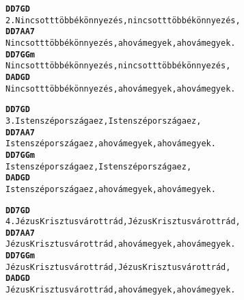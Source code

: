 \cleardoublepage
{}
\kottastart
{}
\kottaend
\begin{minipage}{\textwidth}
\begin{alltt}
\textbf{              D           D7             G           D}
2. Nincs ott többé könnyezés, nincs ott többé könnyezés,
\textbf{              D           D7            A             A7}
   Nincs ott többé könnyezés, ahová megyek, ahová megyek.
\textbf{              D           D7             G           Gm}
   Nincs ott többé könnyezés, nincs ott többé könnyezés,
\textbf{              D           A             D       G     D}
   Nincs ott többé könnyezés, ahová megyek, ahová megyek.
\end{alltt}
\vspace{0.0cm}
\versszakspacing
\end{minipage}
\begin{minipage}{\textwidth}
\begin{alltt}
\textbf{           D          D7          G          D}
3. Isten szép országa ez, Isten szép országa ez,
\textbf{           D          D7            A             A7}
   Isten szép országa ez, ahová megyek, ahová megyek.
\textbf{           D          D7          G          Gm}
   Isten szép országa ez, Isten szép országa ez,
\textbf{           D          A             D       G     D}
   Isten szép országa ez, ahová megyek, ahová megyek.
\end{alltt}
\vspace{0.0cm}
\versszakspacing
\end{minipage}
\begin{minipage}{\textwidth}
\begin{alltt}
\textbf{           D               D7          G               D}
4. Jézus Krisztus vár ott rád, Jézus Krisztus vár ott rád,
\textbf{           D               D7            A             A7}
   Jézus Krisztus vár ott rád, ahová megyek, ahová megyek.
\textbf{           D               D7          G               Gm}
   Jézus Krisztus vár ott rád, Jézus Krisztus vár ott rád,
\textbf{           D               A             D       G     D}
   Jézus Krisztus vár ott rád, ahová megyek, ahová megyek.
\end{alltt}
\vspace{0.0cm}
\versszakspacing
\end{minipage}
